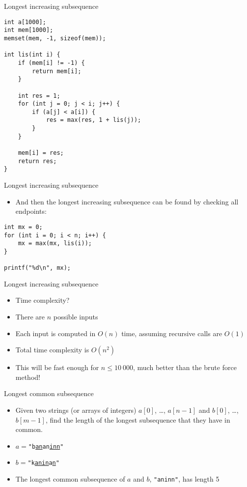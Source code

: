 \documentclass[10pt]{beamer}
\newcommand{\bi}{\begin{itemize}}
\newcommand{\ei}{\end{itemize}}
\begin{document}
\begin{frame}[fragile]{Longest increasing subsequence}
    \begin{verbatim}
int a[1000];
int mem[1000];
memset(mem, -1, sizeof(mem));

int lis(int i) {
    if (mem[i] != -1) {
        return mem[i];
    }

    int res = 1;
    for (int j = 0; j < i; j++) {
        if (a[j] < a[i]) {
            res = max(res, 1 + lis(j));
        }
    }

    mem[i] = res;
    return res;
}
    \end{verbatim}
\end{frame}

\begin{frame}[fragile]{Longest increasing subsequence}
    \vspace{30pt}

    \bi
        \item And then the longest increasing subsequence can be found by checking all endpoints:
    \ei

    \begin{verbatim}
int mx = 0;
for (int i = 0; i < n; i++) {
    mx = max(mx, lis(i));
}

printf("%d\n", mx);
    \end{verbatim}
\end{frame}

\begin{frame}{Longest increasing subsequence}
    \vspace{30pt}
    \bi
        \item Time complexity?
            \vspace{10pt}
        \item There are $n$ possible inputs
        \item Each input is computed in $O(n)$ time, assuming recursive calls are $O(1)$
        \item Total time complexity is $O(n^2)$
            \vspace{10pt}
        \item This will be fast enough for $n \leq 10\ 000$, much better than the brute force method!
    \ei
\end{frame}


\begin{frame}{Longest common subsequence}
    \vspace{20pt}
    \bi
\item Given two strings (or arrays of integers) $a[0]$, \ldots, $a[n-1]$ and $b[0]$, \ldots, $b[m-1]$, find the length of the longest subsequence that they have in common.

    \vspace{10pt}
\item $a = $\texttt{"b\underline{an}an\underline{inn}"}
\item $b = $\texttt{"k\underline{anin}a\underline{n}"}
    \vspace{5pt}
\item The longest common subsequence of $a$ and $b$, \texttt{"aninn"}, has length 5
    \ei
\end{frame}
\end{document}
